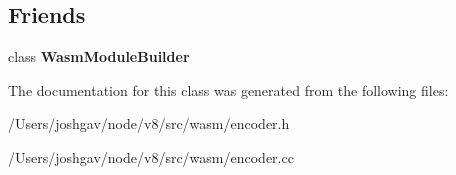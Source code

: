 \subsection*{Friends}
\begin{DoxyCompactItemize}
\item 
class {\bfseries Wasm\+Module\+Builder}\hypertarget{classv8_1_1internal_1_1wasm_1_1_wasm_module_writer_ace63ff4bed9fda245c733e10c4a9714b}{}\label{classv8_1_1internal_1_1wasm_1_1_wasm_module_writer_ace63ff4bed9fda245c733e10c4a9714b}

\end{DoxyCompactItemize}


The documentation for this class was generated from the following files\+:\begin{DoxyCompactItemize}
\item 
/\+Users/joshgav/node/v8/src/wasm/encoder.\+h\item 
/\+Users/joshgav/node/v8/src/wasm/encoder.\+cc\end{DoxyCompactItemize}
